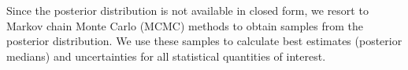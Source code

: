 \documentclass{article}
\newcommand{\bg}{\boldsymbol{g}}
\newcommand{\bh}{\boldsymbol{h}}
\begin{document}
Since the posterior distribution is not available in closed form, we resort to Markov chain Monte Carlo (MCMC) methods to obtain samples from the posterior distribution. We use these samples to calculate best estimates (posterior medians) and uncertainties for all statistical quantities of interest.
\end{document}
